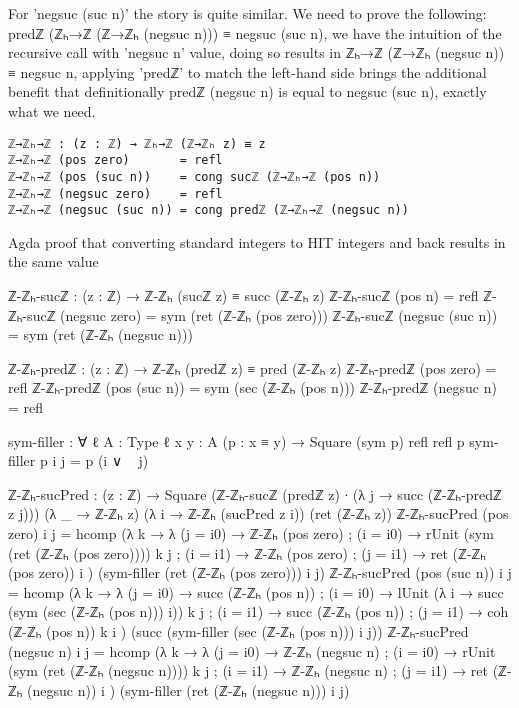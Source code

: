 For 'negsuc (suc n)' the story is quite similar. We need to prove the following: predℤ (ℤₕ→ℤ (ℤ→ℤₕ (negsuc n))) ≡ negsuc (suc n), we have the intuition of the recursive call with 'negsuc n' value, doing so results in ℤₕ→ℤ (ℤ→ℤₕ (negsuc n)) ≡ negsuc n, applying 'predℤ' to match the left-hand side brings the additional benefit that definitionally predℤ (negsuc n) is equal to negsuc (suc n), exactly what we need.

\begin{listing}[H]
\begin{verbatim}
ℤ→ℤₕ→ℤ : (z : ℤ) → ℤₕ→ℤ (ℤ→ℤₕ z) ≡ z
ℤ→ℤₕ→ℤ (pos zero)       = refl
ℤ→ℤₕ→ℤ (pos (suc n))    = cong sucℤ (ℤ→ℤₕ→ℤ (pos n))
ℤ→ℤₕ→ℤ (negsuc zero)    = refl
ℤ→ℤₕ→ℤ (negsuc (suc n)) = cong predℤ (ℤ→ℤₕ→ℤ (negsuc n))
\end{verbatim}
\caption{Agda proof that converting standard integers to HIT integers and back results in the same value}
\end{listing}
ℤ-ℤₕ-sucℤ : (z : ℤ) → ℤ-ℤₕ (sucℤ z) ≡ succ (ℤ-ℤₕ z)
ℤ-ℤₕ-sucℤ (pos n)          = refl
ℤ-ℤₕ-sucℤ (negsuc zero)    = sym (ret (ℤ-ℤₕ (pos zero)))
ℤ-ℤₕ-sucℤ (negsuc (suc n)) = sym (ret (ℤ-ℤₕ (negsuc n)))

ℤ-ℤₕ-predℤ : (z : ℤ) → ℤ-ℤₕ (predℤ z) ≡ pred (ℤ-ℤₕ z)
ℤ-ℤₕ-predℤ (pos zero)    = refl
ℤ-ℤₕ-predℤ (pos (suc n)) = sym (sec (ℤ-ℤₕ (pos n)))
ℤ-ℤₕ-predℤ (negsuc n)    = refl

sym-filler : ∀ {ℓ} {A : Type ℓ} {x y : A} (p : x ≡ y)
                → Square (sym p)
                         refl
                         refl
                         p
sym-filler p i j = p (i ∨ ~ j)

ℤ-ℤₕ-sucPred : (z : ℤ)
              → Square (ℤ-ℤₕ-sucℤ (predℤ z) ∙ (λ j → succ (ℤ-ℤₕ-predℤ z j)))
                       (λ _ → ℤ-ℤₕ z)
                       (λ i → ℤ-ℤₕ (sucPred z i))
                       (ret (ℤ-ℤₕ z))
ℤ-ℤₕ-sucPred (pos zero) i j =
  hcomp (λ k → λ { (j = i0) → ℤ-ℤₕ (pos zero)
                 ; (i = i0) → rUnit (sym (ret (ℤ-ℤₕ (pos zero)))) k j
                 ; (i = i1) → ℤ-ℤₕ (pos zero)
                 ; (j = i1) → ret (ℤ-ℤₕ (pos zero)) i
                 })
        (sym-filler (ret (ℤ-ℤₕ (pos zero))) i j)
ℤ-ℤₕ-sucPred (pos (suc n)) i j =
  hcomp (λ k → λ { (j = i0) → succ (ℤ-ℤₕ (pos n))
                 ; (i = i0) → lUnit (λ i → succ (sym (sec (ℤ-ℤₕ (pos n))) i)) k j
                 ; (i = i1) → succ (ℤ-ℤₕ (pos n))
                 ; (j = i1) → coh (ℤ-ℤₕ (pos n)) k i
                 })
        (succ (sym-filler (sec (ℤ-ℤₕ (pos n))) i j))
ℤ-ℤₕ-sucPred (negsuc n) i j =
  hcomp (λ k → λ { (j = i0) → ℤ-ℤₕ (negsuc n)
                 ; (i = i0) → rUnit (sym (ret (ℤ-ℤₕ (negsuc n)))) k j
                 ; (i = i1) → ℤ-ℤₕ (negsuc n)
                 ; (j = i1) → ret (ℤ-ℤₕ (negsuc n)) i
                 })
        (sym-filler (ret (ℤ-ℤₕ (negsuc n))) i j)


